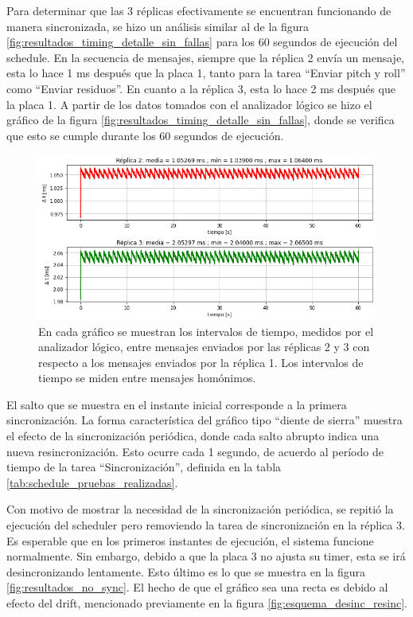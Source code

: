 Para determinar que las 3 réplicas efectivamente se encuentran funcionando de manera sincronizada, se hizo un análisis similar al de la figura \ref{fig:resultados_timing_detalle_sin_fallas} para los 60 segundos de ejecución del schedule. En la secuencia de mensajes, siempre que la réplica 2 envía un mensaje, esta lo hace 1 ms después que la placa 1, tanto para la tarea ``Enviar pitch y roll'' como ``Enviar residuos''. En cuanto a la réplica 3, esta lo hace 2 ms después que la placa 1. A partir de los datos tomados con el analizador lógico se hizo el gráfico de la figura \ref{fig:resultados_timing_detalle_sin_fallas}, donde se verifica que esto se cumple durante los 60 segundos de ejecución.

\begin{figure}[htb]
    \centering
    \includegraphics[width=\textwidth]{img/resultados_sincronizacion_sin_fallas.png}
    \caption{En cada gráfico se muestran los intervalos de tiempo, medidos por el analizador lógico, entre mensajes enviados por las réplicas 2 y 3 con respecto a los mensajes enviados por la réplica 1. Los intervalos de tiempo se miden entre mensajes homónimos.}
    \label{fig:resultados_sincronizacion_sin_fallas}
\end{figure}

El salto que se muestra en el instante inicial corresponde a la primera sincronización. La forma característica del gráfico tipo ``diente de sierra'' muestra el efecto de la sincronización periódica, donde cada salto abrupto indica una nueva resincronización. Esto ocurre cada 1 segundo, de acuerdo al período de tiempo de la tarea ``Sincronización'', definida en la tabla \ref{tab:schedule_pruebas_realizadas}.

Con motivo de mostrar la necesidad de la sincronización periódica, se repitió la ejecución del scheduler pero removiendo la tarea de sincronización en la réplica 3. Es esperable que en los primeros instantes de ejecución, el sistema funcione normalmente. Sin embargo, debido a que la placa 3 no ajusta su timer, esta se irá desincronizando lentamente. Esto último es lo que se muestra en la figura \ref{fig:resultados_no_sync}. El hecho de que el gráfico sea una recta es debido al efecto del drift, mencionado previamente en la figura \ref{fig:esquema_desinc_resinc}. 

